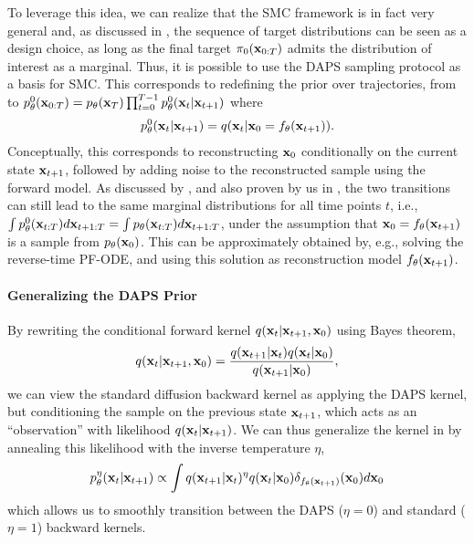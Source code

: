 \documentclass{proc}
\begin{document}
To leverage this idea, we can realize that the SMC framework is in fact very general and, as discussed in , the sequence of target distributions can be seen as a design choice, as long as the final target $\pi_0(\mathbf{x}_{0:T})$ admits the distribution of interest as a marginal. Thus, it is possible to use the DAPS sampling protocol as a basis for SMC. This corresponds to redefining the prior over trajectories, from  to $p_\theta^0(\mathbf{x}_{0:T}) = p_\theta(\mathbf{x}_T)\prod_{t=0}^{T-1}p_\theta^0(\mathbf{x}_{t}|\mathbf{x}_{t+1})$ where
\begin{align}
    p_\theta^0(\mathbf{x}_{t}|\mathbf{x}_{t+1}) = q(\mathbf{x}_{t}|\mathbf{x}_0=f_\theta(\mathbf{x}_{t+1})).
\end{align}
Conceptually, this corresponds to reconstructing $\mathbf{x}_0$ conditionally on the current state $\mathbf{x}_{t+1}$, followed by adding noise to the reconstructed sample using the forward model. As discussed by \citet{zhang_improving_2024}, and also proven by us in , the two transitions can still lead to the same marginal distributions for all time points $t$, i.e., $\int p_\theta^0(\mathbf{x}_{t:T})d\mathbf{x}_{t+1:T} = \int p_\theta(\mathbf{x}_{t:T})d\mathbf{x}_{t+1:T}$,  under the assumption that $\mathbf{x}_0 = f_\theta(\mathbf{x}_{t+1})$ is a sample from $p_\theta(\mathbf{x}_0)$. This can be approximately obtained by, e.g., solving the reverse-time PF-ODE, and using this solution as reconstruction model $f_\theta(\mathbf{x}_{t+1})$.

\paragraph{Generalizing the DAPS Prior}
By rewriting the conditional forward kernel $q(\mathbf{x}_{t}|\mathbf{x}_{t+1}, \mathbf{x}_0)$ using Bayes theorem,
\begin{align}
    q(\mathbf{x}_{t}|\mathbf{x}_{t+1}, \mathbf{x}_0) = \frac{q(\mathbf{x}_{t+1}|\mathbf{x}_{t})q(\mathbf{x}_{t}|\mathbf{x}_0)}{q(\mathbf{x}_{t+1}|\mathbf{x}_0)},
\end{align}
we can view the standard diffusion backward kernel  as applying the DAPS kernel, but conditioning the sample on the previous state $\mathbf{x}_{t+1}$, which acts as an ``observation'' with likelihood $q(\mathbf{x}_{t}|\mathbf{x}_{t+1})$. We can thus generalize the kernel in  by annealing this likelihood with the inverse temperature $\eta$, 
\begin{align}
    p_\theta^\eta(\mathbf{x}_{t}|\mathbf{x}_{t+1}) 
    \propto \int 
    q(\mathbf{x}_{t+1}|\mathbf{x}_{t})^\eta q(\mathbf{x}_{t}|\mathbf{x}_0)
    \delta_{f_\theta(\mathbf{x}_{t+1})}(\mathbf{x}_0)
    d\mathbf{x}_0
\end{align}
which allows us to smoothly transition between the DAPS ($\eta=0$) and standard ($\eta=1$) backward kernels.
\end{document}
